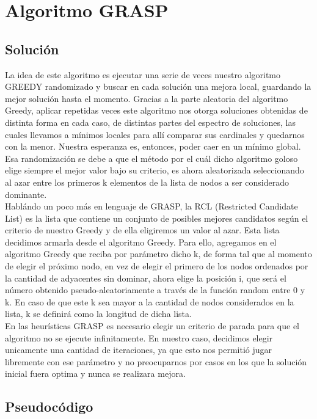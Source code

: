 \section{Algoritmo GRASP}


\subsection{Solución}
La idea de este algoritmo es ejecutar una serie de veces nuestro algoritmo GREEDY randomizado y buscar en cada solución una mejora local, guardando la mejor solución hasta el momento.
Gracias a la parte aleatoria del algoritmo Greedy, aplicar repetidas veces este algoritmo nos otorga soluciones obtenidas de distinta forma en cada caso, de distintas partes del espectro de soluciones, las cuales llevamos a mínimos locales para allí comparar sus cardinales y quedarnos con la menor. Nuestra esperanza es, entonces, poder caer en un mínimo global.
Esa randomización se debe a que el método por el cuál dicho algoritmo goloso elige siempre el mejor valor bajo su criterio, es ahora aleatorizada seleccionando al azar entre los primeros k elementos de la
lista de nodos a ser considerado dominante.\\
Hablándo un poco más en lenguaje de GRASP, la RCL (Restricted Candidate List) es la lista que contiene un conjunto de posibles mejores candidatos según el criterio de nuestro Greedy y de ella eligiremos un valor al azar. Esta lista decidimos armarla desde el algoritmo Greedy.
Para ello, agregamos en el algoritmo Greedy que reciba por parámetro dicho k, de forma tal que al momento de elegir el próximo nodo, en vez de elegir el primero de los nodos ordenados por la cantidad de adyacentes
sin dominar, ahora elige la posición i, que será el número obtenido pseudo-aleatoriamente a través de la función random entre 0 y k. En caso de que este k sea mayor a la cantidad de nodos considerados en la lista, 
k se definirá como la longitud de dicha lista.\\
En las heurísticas GRASP es necesario elegir un criterio de parada para que el algoritmo no se ejecute infinitamente. En nuestro caso, decidimos elegir unicamente
una cantidad de iteraciones, ya que esto nos permitió jugar libremente con ese parámetro y no preocuparnos por casos en los que
la solución inicial fuera optima y nunca se realizara mejora.


\subsection{Pseudocódigo}

